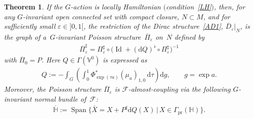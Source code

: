 \documentclass[10pt,a4paper]{amsart}
\numberwithin{equation}{section}
\newtheorem{Theorem}{Theorem}[section]
\begin{document}
\begin{Theorem}\label{teo42}
If the $G$-action is locally Hamiltonian $($condition~\eqref{LH}$)$, then, for any $G$-invariant open connected set with compact closure, $N\subset M$, and for sufficiently small $\varepsilon\in {]0,1[}$, the restriction of the Dirac structure~\eqref{AD1}, $\overline{D}_{\varepsilon}|_N$, is the graph of a~$G$-invariant Poisson structure~$\overline{\Pi}_{\varepsilon}$ on~$N$ defined by
\begin{gather}\label{AP1}
\overline{\Pi}_{\varepsilon}^{\sharp}=\Pi_{\varepsilon}^{\sharp}\circ \big(\operatorname{Id}+(\mathrm{d}Q)^{\flat}\circ\Pi_{\varepsilon}^{\sharp}\big)^{-1}
\end{gather}
with $\overline{\Pi}_{0}=P$. Here $Q\in\Gamma(\mathbb{V}^{0})$ is expressed as
\begin{gather}\label{AP2}
Q:=-\int_G \left( \int^1_0 \Phi_{\exp(\tau a)}^{\ast}(\mu_{a})_{1,0}\,\mathrm{d}\tau\right)\mathrm{d}g,\qquad g=\exp a.
\end{gather}
Moreover, the Poisson structure $\overline{\Pi}_{\varepsilon}$ is $\mathcal{F}$-almost-coupling via the following $G$-invariant normal bundle of~$\mathcal{F}$:
\begin{gather}\label{IN}
\mathbb{\overline{H}}:=\operatorname*{Span}\big\{\bar{X}=X+P^{\sharp}\mathrm{d}Q(X)\,|\, X\in\Gamma_{\operatorname*{pr}}(\mathbb{H})\big\}.
\end{gather}
\end{Theorem}
\end{document}

